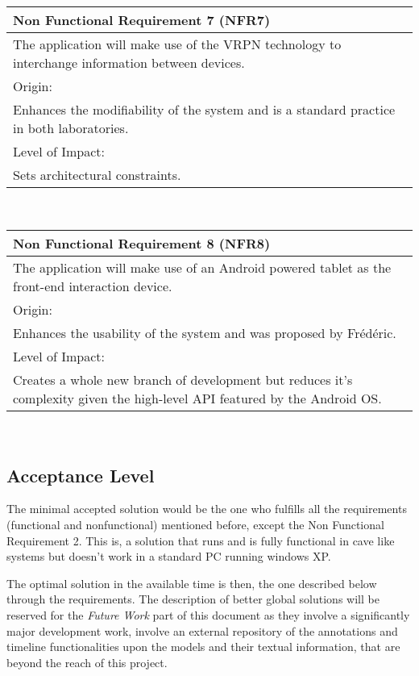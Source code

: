 \begin{center}
\begin{tabular}{p{12.6cm}}
	\hline
	{\Large Non Functional Requirement 7 (NFR7)}\\ \hline \hline
	The application will make use of the VRPN technology to interchange information between devices. \\ \hline
	\large{Origin:}\\ \hline
	Enhances the modifiability of the system and is a standard practice in both laboratories.\\ \hline \hline
	\large{Level of Impact:}\\ \hline
	Sets architectural constraints.\\
	\hline
\end{tabular}\\
\vspace{10mm}

\begin{tabular}{p{12.6cm}}
	\hline
	{\Large Non Functional Requirement 8 (NFR8)}\\ \hline \hline
	The application will make use of an Android powered tablet as the front-end interaction device. \\ \hline
	\large{Origin:}\\ \hline
	Enhances the usability of the system and was proposed by Frédéric.\\ \hline \hline
	\large{Level of Impact:}\\ \hline
	Creates a whole new branch of development but reduces it's complexity given the high-level API featured by the Android OS.\\
	\hline
\end{tabular}\\
\vspace{10mm}

\end{center}

\subsection{Acceptance Level}

The minimal accepted solution would be the one who fulfills all the requirements (functional and nonfunctional) mentioned before, except the Non Functional Requirement 2. This is, a solution that runs and is fully functional in cave like systems but doesn't work in a standard PC running windows XP.  

The optimal solution in the available time is then, the one described below through the requirements. The description of better global solutions will be reserved for the \emph{Future Work} part of this document as they involve a significantly major development work, involve an external repository of the annotations and timeline functionalities upon the models and their textual information, that are beyond the reach of this project.

